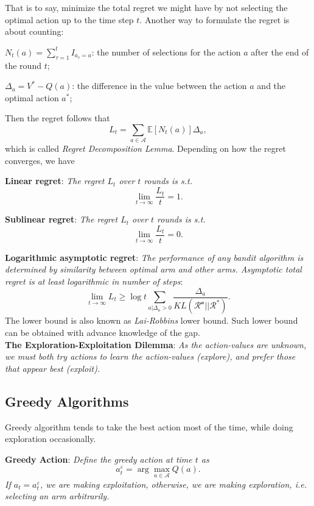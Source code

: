\documentclass{progartcn}
\begin{document}
			That is to say, minimize the total regret we might have by not selecting the optimal action up to the time step $t$. Another way to formulate the regret is about counting:

			$N_t(a)=\sum_{\tau=1}^t I_{a_\tau=a}$: the number of selections for the action $a$ after the end of the round $t$;

			$\Delta_a=V^\ast-Q(a)$: the difference in the value between the action $a$ and the optimal action $a^\ast$;

			Then the regret follows that
			\[
			L_t=\sum_{a\in \mathcal{A}}\mathbb{E}[N_t(a)]\Delta_a,
			\label{rl_regret_count}
			\]
			which is called \textit{Regret Decomposition Lemma}. Depending on how the regret converges, we have

			\textbf{Linear regret}: \textit{The regret $L_t$ over $t$ rounds is s.t.}
			\[\lim_{t\to\infty} \frac{L_t}{t}=1.\]

			\textbf{Sublinear regret}: \textit{The regret $L_t$ over $t$ rounds is s.t.}
			\[\lim_{t\to\infty} \frac{L_t}{t}=0.\]

			\textbf{Logarithmic asymptotic regret}: \textit{The performance of any bandit algorithm is determined by similarity between optimal arm and other arms. Asymptotic total regret is at least logarithmic in number of steps}:
			\[\lim_{t\to\infty}L_t\ge \log t\sum_{a|\Delta_a>0}\frac{\Delta_a}{KL(\mathcal{R^a}||\mathcal{R^\ast})}.\]
			The lower bound is also known as \textit{Lai-Robbins} lower bound. Such lower bound can be obtained with advance knowledge of the gap.\\

			\textbf{The Exploration-Exploitation Dilemma}: \textit{As the action-values are unknown, we must both try actions to learn the action-values (explore), and prefer those that appear best (exploit).}\\

	\subsection{Greedy Algorithms}

			Greedy algorithm tends to take the best action most of the time, while doing exploration occasionally.

			\textbf{Greedy Action}: \textit{Define the greedy action at time $t$ as
			\[a^\varepsilon_t=\arg\max_{a\in \mathcal{A}} Q(a).\]
			If $a_t=a_t^\varepsilon$, we are making exploitation, otherwise, we are making exploration, i.e. selecting an arm arbitrarily.}
\end{document}
